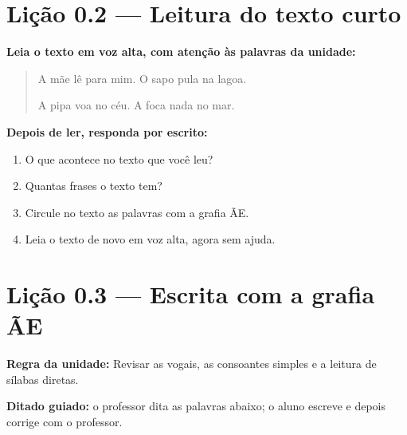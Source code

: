 \section{Lição 0.2 --- Leitura do texto curto}

\noindent\textbf{Leia o texto em voz alta, com atenção às palavras da unidade:}


\begin{quote}
A mãe lê para mim. O sapo pula na lagoa.

A pipa voa no céu. A foca nada no mar.
\end{quote}

\textbf{Depois de ler, responda por escrito:}
\begin{enumerate}

  \item O que acontece no texto que você leu?
  \begin{center}
  \underline{\hspace{12cm}}
  \end{center}

  \item Quantas frases o texto tem?
  \begin{center}
  \underline{\hspace{12cm}}
  \end{center}

  \item Circule no texto as palavras com a grafia ÃE.

  \item Leia o texto de novo em voz alta, agora sem ajuda.

\end{enumerate}

\section{Lição 0.3 --- Escrita com a grafia ÃE}

\noindent\textbf{Regra da unidade:} Revisar as vogais, as consoantes simples e a leitura de sílabas diretas.


\noindent\textbf{Ditado guiado:} o professor dita as palavras abaixo; o aluno escreve e depois corrige com o professor.

\begin{center}
  \underline{\hspace{2.3cm}} \quad \underline{\hspace{2.3cm}} \quad \underline{\hspace{2.3cm}} \quad \underline{\hspace{2.3cm}}

  \underline{\hspace{2.3cm}} \quad \underline{\hspace{2.3cm}} \quad \underline{\hspace{2.3cm}} \quad \underline{\hspace{2.3cm}}
\end{center}

